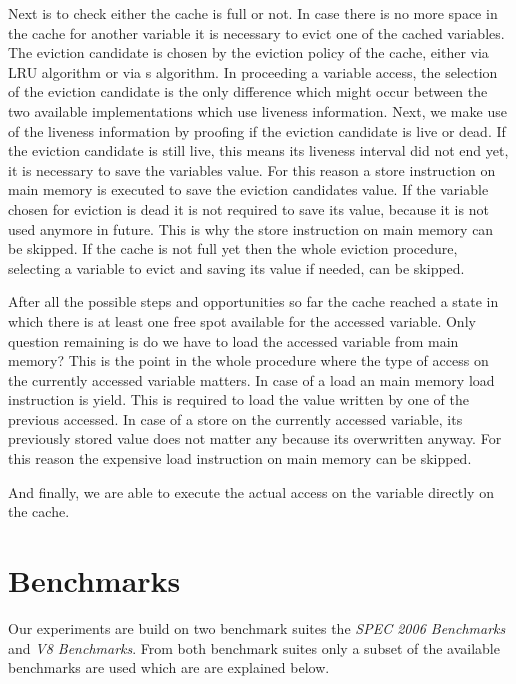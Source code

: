 \documentclass[onecolumn, openright, master, english, signatures]{dbrgrptt}
\begin{document}
Next is to check either the cache is full or not. In case there is no more space in the cache for another variable it is necessary to evict one of the cached variables. The eviction candidate is chosen by the eviction policy of the cache, either via \ac{LRU} algorithm or via s algorithm. In proceeding a variable access, the selection of the eviction candidate is the only difference which might occur between the two available implementations which use liveness information. Next, we make use of the liveness information by proofing if the eviction candidate is live or dead. If the eviction candidate is still live, this means its liveness interval did not end yet, it is necessary to save the variables value. For this reason a store instruction on main memory is executed to save the eviction candidates value. If the variable chosen for eviction is dead it is not required to save its value, because it is not used anymore in future. This is why the store instruction on main memory can be skipped.
If the cache is not full yet then the whole eviction procedure, selecting a variable to evict and saving its value if needed, can be skipped.

After all the possible steps and opportunities so far the cache reached a state in which there is at least one free spot available for the accessed variable. Only question remaining is do we have to load the accessed variable from main memory? This is the point in the whole procedure where the type of access on the currently accessed variable matters. In case of a load an main memory load instruction is yield. This is required to load the value written by one of the previous accessed. In case of a store on the currently accessed variable, its previously stored value does not matter any because its overwritten anyway. For this reason the expensive load instruction on main memory can be skipped.

And finally, we are able to execute the actual access on the variable directly on the cache.


\section{Benchmarks}\label{sec:benchmarks}

Our experiments are build on two benchmark suites the \emph{SPEC 2006 Benchmarks}\cite{henning2006spec} and \emph{V8 Benchmarks}\cite{v8benchmarks}. From both benchmark suites only a subset of the available benchmarks are used which are are explained below.
\end{document}
